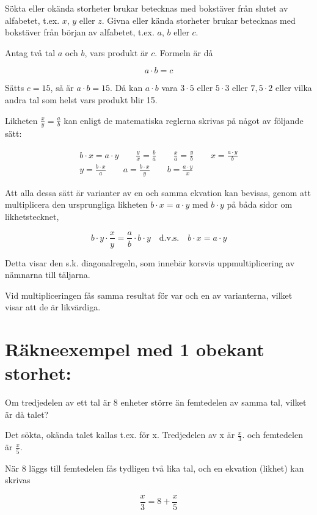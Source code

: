 Sökta eller okända storheter brukar betecknas med bokstäver från slutet av
alfabetet, t.ex. $x$, $y$ eller $z$. Givna eller kända storheter brukar betecknas med
bokstäver från början av alfabetet, t.ex. $a$, $b$ eller $c$.

Antag två tal $a$ och $b$, vars produkt är $c$.
Formeln är då

$$a \cdot b = c$$

Sätts \(c = 15\), så är \(a \cdot b = 15\). Då kan \(a \cdot b\) vara \(3 \cdot
5\) eller \(5 \cdot 3\) eller \(7,5 \cdot 2\) eller vilka andra tal som helst
vars produkt blir 15.

Likheten \(\frac{x}{y} = \frac{a}{b}\) kan enligt de matematiska reglerna
skrivas på något av följande sätt:

\begin{gather*}
b \cdot x = a \cdot y \qquad
\frac{y}{x} = \frac{b}{a} \qquad
\frac{x}{a} = \frac{y}{b} \qquad
x = \frac{a \cdot y}{b} \\
y = \frac{b \cdot x}{a} \qquad
a = \frac{b \cdot x}{y} \qquad
b = \frac{a \cdot y}{x}
\end{gather*}

Att alla dessa sätt är varianter av en och samma ekvation kan bevisas, genom att
multiplicera den ursprungliga likheten \(b \cdot x = a \cdot y\) med \(b \cdot
y\) på båda sidor om likhetstecknet,

\[
b \cdot y \cdot \frac{x}{y} = \frac{a}{b} \cdot b \cdot y \quad \text{d.v.s.}
\quad b \cdot x = a \cdot y
\]

Detta visar den s.k. diagonalregeln, som innebär korsvis uppmultiplicering av
nämnarna till täljarna.

Vid multipliceringen fås samma resultat för var och en av varianterna, vilket
visar att de är likvärdiga.

\section{Räkneexempel med 1 obekant storhet:}

Om tredjedelen av ett tal är 8 enheter större än femtedelen av samma tal, vilket
är då talet?

Det sökta, okända talet kallas t.ex. för x. Tredjedelen av x är
\(\frac{x}{3}\). och femtedelen är \(\frac{x}{5}\).

När 8 läggs till femtedelen fås tydligen två lika tal, och en ekvation (likhet)
kan skrivas

\[\frac{x}{3}=8 + \frac{x}{5}\]

